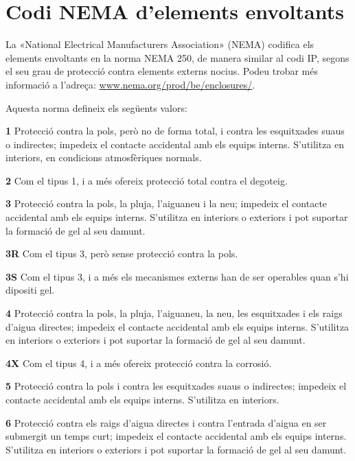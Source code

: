 \section{Codi NEMA d'elements envoltants}
 

La «National Electrical Manufacturers Association» (NEMA)
codifica els elements envoltants en la norma NEMA 250, de manera similar al codi IP, segons el seu grau de protecció contra elements externs nocius. Podeu trobar més informació a l'adreça: \href{http://www.nema.org/prod/be/enclosures/}{www.nema.org/prod/be/enclosures/}.

Aquesta norma defineix els següents valors:

\begin{list}{}
   {\setlength{\labelwidth}{10mm} \setlength{\leftmargin}{10mm} \setlength{\labelsep}{2mm}}
   \item[\textbf{1}] Protecció contra la pols, però no de forma total, i contra les esquitxades suaus o indirectes; impedeix el contacte accidental amb els equips interns. S'utilitza en interiors, en condicions atmosfèriques normals.
   \item[\textbf{2}] Com el tipus 1, i a més ofereix protecció total contra el degoteig.
   \item[\textbf{3}] Protecció contra la pols, la pluja, l'aiguaneu i la neu; impedeix el contacte accidental amb els equips interns. S'utilitza en interiors o exteriors i pot suportar la formació de gel al seu damunt.
   \item[\textbf{3R}] Com el tipus 3, però sense protecció contra la pols.
   \item[\textbf{3S}] Com el tipus 3, i a més els mecanismes externs han de ser operables quan s'hi dipositi gel.
    \item[\textbf{4}] Protecció contra la pols, la pluja, l'aiguaneu, la neu, les esquitxades i els raigs d'aigua directes; impedeix el contacte accidental amb els equips interns. S'utilitza en interiors o exteriors i pot suportar la formació de gel al seu damunt.
   \item[\textbf{4X}] Com el tipus 4, i a més ofereix protecció contra la corrosió.
   \item[\textbf{5}] Protecció contra la pols i contra les esquitxades suaus o indirectes; impedeix el contacte accidental amb els equips interns. S'utilitza en interiors.
   \item[\textbf{6}] Protecció contra els raigs d'aigua directes i contra l'entrada d'aigua en ser submergit un temps curt; impedeix el contacte accidental amb els equips interns. S'utilitza en interiors o exteriors i pot suportar la formació de gel al seu damunt.

\end{list}
